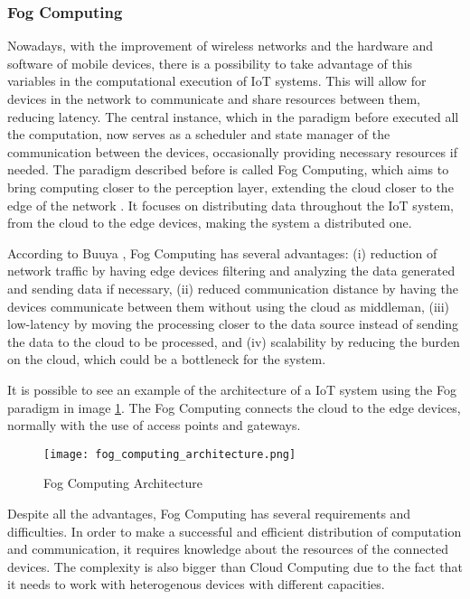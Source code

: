 \subsubsection{Fog Computing}\label{sec:fog_computing}

Nowadays, with the improvement of wireless networks and the hardware and software of mobile devices, there is a possibility to take advantage of this variables in the computational execution of IoT systems. This will allow for devices in the network to communicate and share resources between them, reducing latency. The central instance, which in the paradigm before executed all the computation, now serves as a scheduler and state manager of the communication between the devices, occasionally providing necessary resources if needed. The paradigm described before is called Fog Computing, which aims to bring computing closer to the perception layer, extending the cloud closer to the edge of the network \cite{mobile_cloud}. It focuses on distributing data throughout the IoT system, from the cloud to the edge devices, making the system a distributed one.
\par According to Buuya \cite{IoT_principles_and_paradigms}, Fog Computing has several advantages: (i) reduction of network traffic by having edge devices filtering and analyzing the data generated and sending data if necessary, (ii) reduced communication distance by having the devices communicate between them without using the cloud as middleman, (iii) low-latency by moving the processing closer to the data source instead of sending the data to the cloud to be processed, and (iv) scalability by reducing the burden on the cloud, which could be a bottleneck for the system.
\par It is possible to see an example of the architecture of a IoT system using the Fog paradigm in image \ref{fig:fog_architecture}. The Fog Computing connects the cloud to the edge devices, normally with the use of access points and gateways. 

\begin{figure}[h]
\caption{Fog Computing Architecture \cite{IoT_principles_and_paradigms}}
\label{fig:fog_architecture}
\centering
\texttt{[image: fog\_computing\_architecture.png]}
\end{figure}

\par Despite all the advantages, Fog Computing has several requirements and difficulties. In order to make a successful and efficient distribution of computation and communication, it requires knowledge about the resources of the connected devices. The complexity is also bigger than Cloud Computing due to the fact that it needs to work with heterogenous devices with different capacities. 
       
